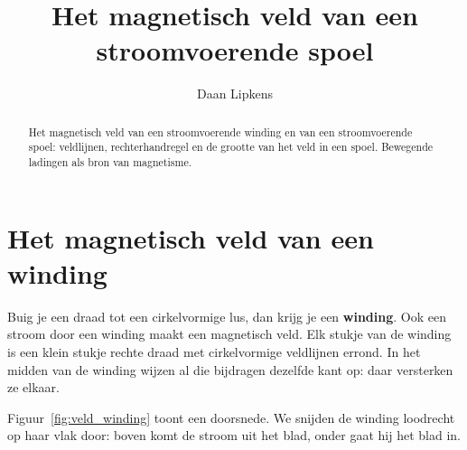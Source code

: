 \documentclass{ximera}
\title{Het magnetisch veld van een stroomvoerende spoel}
\author{Daan Lipkens}
\begin{document}
\begin{abstract}
    Het magnetisch veld van een stroomvoerende winding en van een stroomvoerende spoel: veldlijnen, rechterhandregel en de grootte van het veld in een spoel. Bewegende ladingen als bron van magnetisme.
\end{abstract}
\maketitle
\label{ond:magnetisme_spoel}

\section{Het magnetisch veld van een winding}\label{sec:veld-winding}
Buig je een draad tot een cirkelvormige lus, dan krijg je een \textbf{winding}. Ook een stroom door een winding maakt een magnetisch veld. Elk stukje van de winding is een klein stukje rechte draad met cirkelvormige veldlijnen errond. In het midden van de winding wijzen al die bijdragen dezelfde kant op: daar versterken ze elkaar.

Figuur~\ref{fig:veld_winding} toont een doorsnede. We snijden de winding loodrecht op haar vlak door: boven komt de stroom uit het blad, onder gaat hij het blad in.
\end{document}
